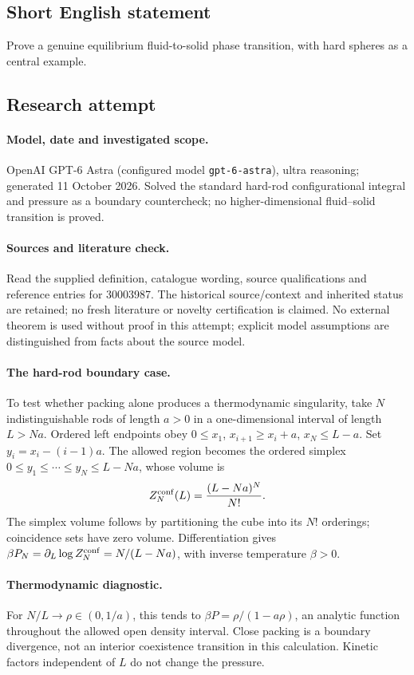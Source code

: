 \documentclass[11pt]{article}
\begin{document}
\subsection{Short English statement}
Prove a genuine equilibrium fluid-to-solid phase transition, with hard spheres as a central example.
\subsection{Research attempt}
\paragraph{Model, date and investigated scope.}
OpenAI GPT-6 Astra (configured model \texttt{gpt-6-astra}), ultra reasoning; generated 11 October 2026. Solved the standard hard-rod configurational integral and pressure as a boundary countercheck; no higher-dimensional fluid–solid transition is proved.

\paragraph{Sources and literature check.}
Read the supplied definition, catalogue wording, source qualifications and reference entries for 30003987. The historical source/context and inherited status are retained; no fresh literature or novelty certification is claimed. No external theorem is used without proof in this attempt; explicit model assumptions are distinguished from facts about the source model.

\paragraph{The hard-rod boundary case.} To test whether packing alone produces a thermodynamic singularity, take \(N\) indistinguishable rods of length \(a>0\) in a one-dimensional interval of length \(L>Na\). Ordered left endpoints obey \(0\le x_1\), \(x_{i+1}\ge x_i+a\), \(x_N\le L-a\). Set \(y_i=x_i-(i-1)a\). The allowed region becomes the ordered simplex \(0\le y_1\le\cdots\le y_N\le L-Na\), whose volume is
\[
 Z_N^{\rm conf}(L)=\frac{(L-Na)^N}{N!}.
\]
The simplex volume follows by partitioning the cube into its \(N!\) orderings; coincidence sets have zero volume. Differentiation gives \(\beta P_N=\partial_L\log Z_N^{\rm conf}=N/(L-Na)\), with inverse temperature \(\beta>0\).
\paragraph{Thermodynamic diagnostic.} For \(N/L\to\rho\in(0,1/a)\), this tends to \(\beta P=\rho/(1-a\rho)\), an analytic function throughout the allowed open density interval. Close packing is a boundary divergence, not an interior coexistence transition in this calculation. Kinetic factors independent of \(L\) do not change the pressure.
\end{document}
